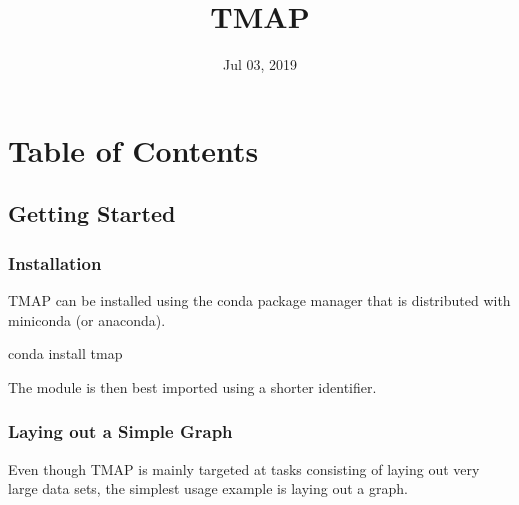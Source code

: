 \documentclass[letterpaper,10pt,english]{sphinxmanual}
\title{TMAP}
\date{Jul 03, 2019}
\author{}
\begin{document}
\pagestyle{empty}
\sphinxmaketitle
\pagestyle{plain}
\sphinxtableofcontents
\pagestyle{normal}
\label{\detokenize{index::doc}}



\chapter{Table of Contents}
\label{\detokenize{index:table-of-contents}}

\section{Getting Started}
\label{\detokenize{tutorial:getting-started}}\label{\detokenize{tutorial::doc}}

\subsection{Installation}
\label{\detokenize{tutorial:installation}}
TMAP can be installed using the conda package manager that
is distributed with miniconda (or anaconda).

\begin{sphinxVerbatim}[commandchars=\\\{\}]
conda install tmap
\end{sphinxVerbatim}

The module is then best imported using a shorter identifier.

\begin{sphinxVerbatim}[commandchars=\\\{\}]
   
\end{sphinxVerbatim}


\subsection{Laying out a Simple Graph}
\label{\detokenize{tutorial:laying-out-a-simple-graph}}
Even though TMAP is mainly targeted at tasks consisting of
laying out very large data sets, the simplest usage example
is laying out a graph.
\end{document}
